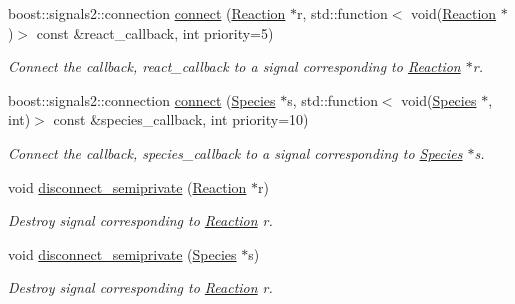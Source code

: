 \begin{DoxyCompactItemize}
boost\-::signals2\-::connection \hyperlink{classSignalingManager_a14226527c31c6dbc758e23f3c37b345d}{connect} (\hyperlink{classReaction}{Reaction} $\ast$r, std\-::function$<$ void(\hyperlink{classReaction}{Reaction} $\ast$)$>$ const \&react\-\_\-callback, int priority=5)
\begin{DoxyCompactList}\small\item\em Connect the callback, react\-\_\-callback to a signal corresponding to \hyperlink{classReaction}{Reaction} $\ast$r. \end{DoxyCompactList}\item 
boost\-::signals2\-::connection \hyperlink{classSignalingManager_a705bc56739da1046abfd74b8e508c5e1}{connect} (\hyperlink{classSpecies}{Species} $\ast$s, std\-::function$<$ void(\hyperlink{classSpecies}{Species} $\ast$, int)$>$ const \&species\-\_\-callback, int priority=10)
\begin{DoxyCompactList}\small\item\em Connect the callback, species\-\_\-callback to a signal corresponding to \hyperlink{classSpecies}{Species} $\ast$s. \end{DoxyCompactList}\item 
void \hyperlink{classSignalingManager_a9132a70c90d2b0363836e237fac31fe7}{disconnect\-\_\-semiprivate} (\hyperlink{classReaction}{Reaction} $\ast$r)
\begin{DoxyCompactList}\small\item\em Destroy signal corresponding to \hyperlink{classReaction}{Reaction} r. \end{DoxyCompactList}\item 
void \hyperlink{classSignalingManager_a3b2fc7d242614807e9c0eee774d863d3}{disconnect\-\_\-semiprivate} (\hyperlink{classSpecies}{Species} $\ast$s)
\begin{DoxyCompactList}\small\item\em Destroy signal corresponding to \hyperlink{classReaction}{Reaction} r. \end{DoxyCompactList}\end{DoxyCompactItemize}
